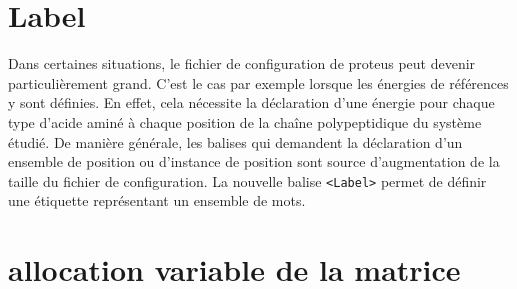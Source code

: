 \section{Label}
Dans certaines situations, le fichier de configuration de proteus peut devenir particulièrement grand. C'est le cas par exemple lorsque les énergies de références y sont définies. En effet, cela nécessite la déclaration d'une énergie pour chaque type d'acide aminé à chaque position de la chaîne polypeptidique du système étudié. De manière générale, les balises qui demandent la déclaration d'un ensemble de position ou d'instance de position sont source d'augmentation de la taille du fichier de configuration. La nouvelle balise \verb!<Label>! permet de définir une étiquette représentant un ensemble de mots.
\section{allocation variable de la matrice}

\clearpage


